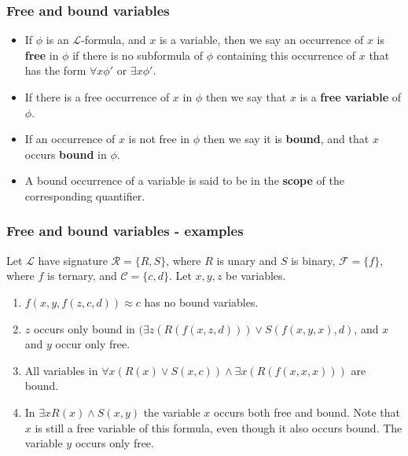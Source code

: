 \documentclass[handout]{beamer}
\newcommand{\sL}{\mathscr{L}}
\newcommand{\cR}{\mathcal{R}}
\newcommand{\cF}{\mathcal{F}}
\newcommand{\cC}{\mathcal{C}}
\begin{document}
\begin{frame}
\frametitle{Free and bound variables}
\begin{itemize}
\item If $\phi$ is an $\sL$-formula, and $x$ is a variable, then we say an occurrence of $x$ is \textbf{free} in $\phi$ if there is no subformula of $\phi$ containing this occurrence of $x$ that has the form $\forall x \phi'$ or $\exists x \phi'$. 
\vspace{0.5cm}
\item If there is a free occurrence of $x$ in $\phi$ then we say that $x$ is a \textbf{free variable} of $\phi$. 
\vspace{0.5cm}
\item If an occurrence of $x$ is not free in $\phi$ then we say it is \textbf{bound}, and that $x$ occurs \textbf{bound} in $\phi$. 
\vspace{0.5cm}
\item A bound occurrence of a variable is said to be in the \textbf{scope} of the corresponding quantifier. 
\end{itemize}
\end{frame}

\begin{frame}
\frametitle{Free and bound variables - examples}
\begin{example}
Let $\sL$ have signature $\cR=\{R,S\}$, where $R$ is unary and $S$ is binary, $\cF=\{f\}$, where $f$ is ternary, and $\cC=\{c,d\}$. Let $x,y,z$ be variables. 
\begin{enumerate}
\item $f(x,y,f(z,c,d)) \approx c$ has no bound variables.
\item $z$ occurs only bound in $(\exists z(R(f(x,z,d)))\vee S(f(x,y,x),d)$, and $x$ and $y$ occur only free.
\item All variables in $\forall x (R(x)\vee S(x,c))\wedge \exists x (R(f(x,x,x)))$ are bound.
\item In $\exists xR(x) \wedge S(x,y)$ the variable $x$ occurs both free and bound. Note that $x$ is still a free variable of this formula, even though it also occurs bound. The variable $y$ occurs only free. 
\end{enumerate}
\end{example}
\end{frame}
\end{document}
